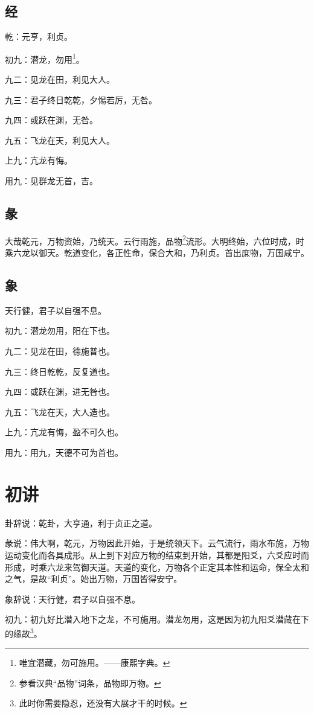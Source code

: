 \documentclass[12pt,oneside]{book}
\begin{document}
\subsection{经}
乾：元亨，利贞。

初九：潜龙，勿用\footnote{唯宜潜藏，勿可施用。——康熙字典。}。

九二：见龙在田，利见大人。

九三：君子终日乾乾，夕惕若厉，无咎。

九四：或跃在渊，无咎。

九五：飞龙在天，利见大人。

上九：亢龙有悔。

用九：见群龙无首，吉。


\subsection{彖}
大哉乾元，万物资始，乃统天。云行雨施，品物\footnote{参看汉典“品物”词条，品物即万物。}流形。大明终始，六位时成，时乘六龙以御天。乾道变化，各正性命，保合大和，乃利贞。首出庶物，万国咸宁。

\subsection{象}
天行健，君子以自强不息。

初九：潜龙勿用，阳在下也。

九二：见龙在田，德施普也。

九三：终日乾乾，反复道也。

九四：或跃在渊，进无咎也。

九五：飞龙在天，大人造也。

上九：亢龙有悔，盈不可久也。

用九：用九，天德不可为首也。


\section{初讲}
卦辞说：乾卦，大亨通，利于贞正之道。

彖说：伟大啊，乾元，万物因此开始，于是统领天下。云气流行，雨水布施，万物运动变化而各具成形。从上到下对应万物的结束到开始，其都是阳爻，六爻应时而形成，时乘六龙来驾御天道。天道的变化，万物各个正定其本性和运命，保全太和之气，是故“利贞”。始出万物，万国皆得安宁。

象辞说：天行健，君子以自强不息。

初九：初九好比潜入地下之龙，不可施用。潜龙勿用，这是因为初九阳爻潜藏在下的缘故\footnote{此时你需要隐忍，还没有大展才干的时候。}。
\end{document}
